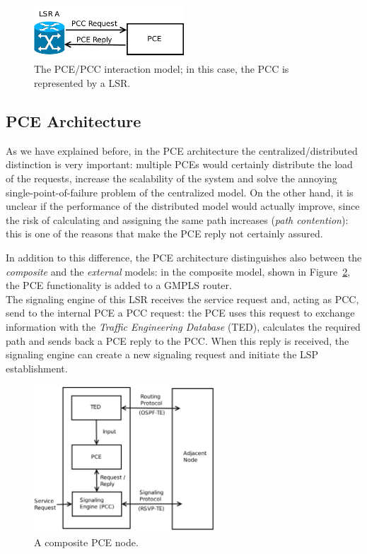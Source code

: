 \documentclass[10pt,a4paper]{report}
\begin{document}
\begin{figure}[!htbp]
  \centering
  \includegraphics[width=0.5\textwidth]{img/pce_pcc}
  \caption[PCE/PCC Model]{The PCE/PCC interaction model; in this case,
    the PCC is represented by a LSR.}
  \label{fig:pce_pcc}
\end{figure}

\subsection{PCE Architecture}
As we have explained before, in the PCE architecture the
centralized/distributed distinction is very important: multiple PCEs
would certainly distribute the load of the requests, increase the
scalability of the system and solve the annoying
single-point-of-failure problem of the centralized model. On the other
hand, it is unclear if the performance of the distributed model would
actually improve, since the risk of calculating and assigning the same
path increases (\textit{path contention}): this is one of the reasons
that make the PCE reply not certainly assured.

In addition to this difference, the PCE architecture distinguishes
also between the \textit{composite} and the \textit{external} models:
in the composite model, shown in Figure~\ref{fig:pce_composite}, the
PCE functionality is added to a GMPLS router. \\
The signaling engine of this LSR receives the service request and,
acting as PCC, send to the internal PCE a PCC request: the PCE uses
this request to exchange information with the \textit{Traffic
  Engineering Database} (TED), calculates the required path and sends
back a PCE reply to the PCC\@. When this reply is received, the
signaling engine can create a new signaling request and initiate the
LSP establishment.

\begin{figure}[!htbp]
  \centering
  \includegraphics[width=0.6\textwidth]{img/pce_composite}
  \caption[Composite PCE model]{A composite PCE node.}
  \label{fig:pce_composite}
\end{figure}
\end{document}
